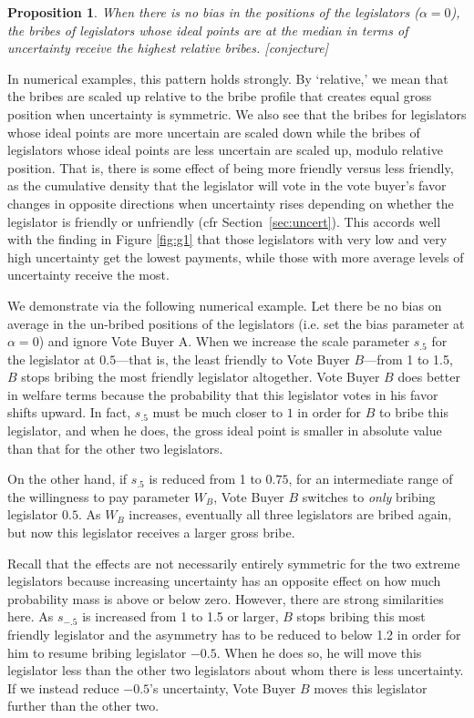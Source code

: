 \documentclass[12pt]{article}
\newtheorem{proposition}{Proposition}
\newcommand{\al}{\alpha}
\begin{document}
\begin{proposition}
  When there is no bias in the positions of the legislators ($\al =0$), the bribes of legislators whose ideal points are at the median in terms of uncertainty receive the highest relative bribes. [conjecture]
	\label{prop:asym}
\end{proposition}
In numerical examples, this pattern holds strongly. By `relative,' we mean that the bribes are scaled up relative to the bribe profile that creates equal gross position when uncertainty is symmetric. We also see that the bribes for legislators whose ideal points are more uncertain are scaled down while the bribes of legislators whose ideal points are less uncertain are scaled up, modulo relative position. That is, there is some effect of being more friendly versus less friendly, as the cumulative density that the legislator will vote in the vote buyer's favor changes in opposite directions when uncertainty rises depending on whether the legislator is friendly or unfriendly (cfr Section~\ref{sec:uncert}). This accords well with the finding in Figure \ref{fig:g1} that those legislators with very low and very high uncertainty get the lowest payments, while those with more average levels of uncertainty receive the most.

We demonstrate via the following numerical example. Let there be no bias on average in the un-bribed positions of the legislators (i.e. set the bias parameter at $\al=0$) and ignore Vote Buyer A. When we increase the scale parameter $s_{.5}$ for the legislator at $0.5$---that is, the least friendly to Vote Buyer $B$---from 1 to 1.5, $B$ stops bribing the most friendly legislator altogether. Vote Buyer $B$ does better in welfare terms because the probability that this legislator votes in his favor shifts upward. In fact, $s_{.5}$ must be much closer to $1$ in order for $B$ to bribe this legislator, and when he does, the gross ideal point is smaller in absolute value than that for the other two legislators.

On the other hand, if $s_{.5}$ is reduced from 1 to $0.75$, for an intermediate range of the willingness to pay parameter $W_B$, Vote Buyer $B$ switches to \textit{only} bribing legislator $0.5$. As $W_B$ increases, eventually all three legislators are bribed again, but now this legislator receives a larger gross bribe.

Recall that the effects are not necessarily entirely symmetric for the two extreme legislators because increasing uncertainty has an opposite effect on how much probability mass is above or below zero. However, there are strong similarities here. As $s_{-.5}$ is increased from 1 to 1.5 or larger, $B$ stops bribing this most friendly legislator and the asymmetry has to be reduced to below 1.2 in order for him to resume bribing legislator $-0.5$. When he does so, he will move this legislator less than the other two legislators about whom there is less uncertainty. If we instead reduce $-0.5$'s uncertainty, Vote Buyer $B$ moves this legislator further than the other two.
		
\end{document}
